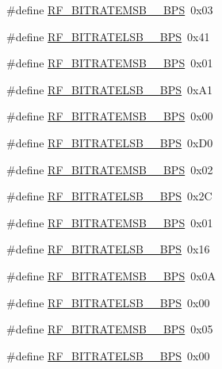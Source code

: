 \begin{DoxyCompactItemize}
\item 
\#define \hyperlink{sx1276Regs-Fsk_8h_a041c9eb73ab4c25e3ed8a25303a49ad0}{R\+F\+\_\+\+B\+I\+T\+R\+A\+T\+E\+M\+S\+B\+\_\+\_\+\+B\+PS}~0x03
\item 
\#define \hyperlink{sx1276Regs-Fsk_8h_a71ea2cd6143ebf9bf63a7118064a471f}{R\+F\+\_\+\+B\+I\+T\+R\+A\+T\+E\+L\+S\+B\+\_\+\_\+\+B\+PS}~0x41
\item 
\#define \hyperlink{sx1276Regs-Fsk_8h_a8e3881281736c31ce8b72b51e801b49d}{R\+F\+\_\+\+B\+I\+T\+R\+A\+T\+E\+M\+S\+B\+\_\+\_\+\+B\+PS}~0x01
\item 
\#define \hyperlink{sx1276Regs-Fsk_8h_ae22ca1c6a214c62d298eb1f6d76ba092}{R\+F\+\_\+\+B\+I\+T\+R\+A\+T\+E\+L\+S\+B\+\_\+\_\+\+B\+PS}~0x\+A1
\item 
\#define \hyperlink{sx1276Regs-Fsk_8h_a68aec0128102e04f2699befbf244f5ec}{R\+F\+\_\+\+B\+I\+T\+R\+A\+T\+E\+M\+S\+B\+\_\+\_\+\+B\+PS}~0x00
\item 
\#define \hyperlink{sx1276Regs-Fsk_8h_a918d453d557cfd2e89c2310591290ef6}{R\+F\+\_\+\+B\+I\+T\+R\+A\+T\+E\+L\+S\+B\+\_\+\_\+\+B\+PS}~0x\+D0
\item 
\#define \hyperlink{sx1276Regs-Fsk_8h_a5c8867e729d049e6b01d95f17daeaa43}{R\+F\+\_\+\+B\+I\+T\+R\+A\+T\+E\+M\+S\+B\+\_\+\_\+\+B\+PS}~0x02
\item 
\#define \hyperlink{sx1276Regs-Fsk_8h_a4b990574403a3171c4bf1ef56f87076c}{R\+F\+\_\+\+B\+I\+T\+R\+A\+T\+E\+L\+S\+B\+\_\+\_\+\+B\+PS}~0x2C
\item 
\#define \hyperlink{sx1276Regs-Fsk_8h_a4f3568a645d981cc5d56d5892fd79fea}{R\+F\+\_\+\+B\+I\+T\+R\+A\+T\+E\+M\+S\+B\+\_\+\_\+\+B\+PS}~0x01
\item 
\#define \hyperlink{sx1276Regs-Fsk_8h_a6677546d2936ed5f36a259f13c123d00}{R\+F\+\_\+\+B\+I\+T\+R\+A\+T\+E\+L\+S\+B\+\_\+\_\+\+B\+PS}~0x16
\item 
\#define \hyperlink{sx1276Regs-Fsk_8h_a8d2d2c7221965aeac9af067528723746}{R\+F\+\_\+\+B\+I\+T\+R\+A\+T\+E\+M\+S\+B\+\_\+\_\+\+B\+PS}~0x0A
\item 
\#define \hyperlink{sx1276Regs-Fsk_8h_a382c67b25793c0884e7bfe662dfb06c6}{R\+F\+\_\+\+B\+I\+T\+R\+A\+T\+E\+L\+S\+B\+\_\+\_\+\+B\+PS}~0x00
\item 
\#define \hyperlink{sx1276Regs-Fsk_8h_a783ebd0eeb85cb90ed09736f058122ed}{R\+F\+\_\+\+B\+I\+T\+R\+A\+T\+E\+M\+S\+B\+\_\+\_\+\+B\+PS}~0x05
\item 
\#define \hyperlink{sx1276Regs-Fsk_8h_af7a1f67d376fd019e9b883a080b35700}{R\+F\+\_\+\+B\+I\+T\+R\+A\+T\+E\+L\+S\+B\+\_\+\_\+\+B\+PS}~0x00

\end{DoxyCompactItemize}
